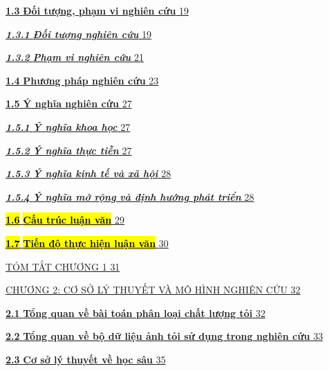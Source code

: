 \documentclass[
]{article}
\begin{document}
\hyperref[_Toc232111984]{\textbf{1.3} \textbf{Đối tượng, phạm vi nghiên
cứu} \hyperref[_Toc232111984]{19}}

\hyperref[_Toc232111985]{\emph{\textbf{1.3.1}} \emph{\textbf{Đối tượng
nghiên cứu}} \hyperref[_Toc232111985]{19}}

\hyperref[_Toc232111986]{\emph{\textbf{1.3.2}} \emph{\textbf{Phạm vi
nghiên cứu}} \hyperref[_Toc232111986]{21}}

\hyperref[_Toc232111987]{\textbf{1.4} \textbf{Phương pháp nghiên cứu}
\hyperref[_Toc232111987]{23}}

\hyperref[_Toc232111988]{\textbf{1.5} \textbf{Ý nghĩa nghiên cứu}
\hyperref[_Toc232111988]{27}}

\hyperref[_Toc232111989]{\emph{\textbf{1.5.1}} \emph{\textbf{Ý nghĩa
khoa học}} \hyperref[_Toc232111989]{27}}

\hyperref[_Toc232111990]{\emph{\textbf{1.5.2}} \emph{\textbf{Ý nghĩa
thực tiễn}} \hyperref[_Toc232111990]{27}}

\hyperref[_Toc232111991]{\emph{\textbf{1.5.3}} \emph{\textbf{Ý nghĩa
kinh tế và xã hội}} \hyperref[_Toc232111991]{28}}

\hyperref[_Toc232111992]{\emph{\textbf{1.5.4}} \emph{\textbf{Ý nghĩa mở
rộng và định hướng phát triển}} \hyperref[_Toc232111992]{28}}

\hyperref[_Toc232111993]{\textbf{\hl{1.6}} \textbf{\hl{Cấu trúc luận
văn}} \hyperref[_Toc232111993]{29}}

\hyperref[_Toc232111994]{\textbf{\hl{1.7}} \textbf{\hl{Tiến độ thực hiện
luận văn}} \hyperref[_Toc232111994]{30}}

\hyperref[tuxf3m-tux1eaft-chux1b0ux1a1ng-1]{TÓM TẮT CHƯƠNG 1
\hyperref[tuxf3m-tux1eaft-chux1b0ux1a1ng-1]{31}}

\hyperref[chux1b0ux1a1ng-2-cux1a1-sux1edf-luxfd-thuyux1ebft-vuxe0-muxf4-huxecnh-nghiuxean-cux1ee9u]{CHƯƠNG
2: CƠ SỞ LÝ THUYẾT VÀ MÔ HÌNH NGHIÊN CỨU
\hyperref[chux1b0ux1a1ng-2-cux1a1-sux1edf-luxfd-thuyux1ebft-vuxe0-muxf4-huxecnh-nghiuxean-cux1ee9u]{32}}

\hyperref[_Toc232111997]{\textbf{2.1} \textbf{Tổng quan về bài toán phân
loại chất lượng tỏi} \hyperref[_Toc232111997]{32}}

\hyperref[_Toc232111998]{\textbf{2.2} \textbf{Tổng quan về bộ dữ liệu
ảnh tỏi sử dụng trong nghiên cứu} \hyperref[_Toc232111998]{33}}

\hyperref[_Toc232111999]{\textbf{2.3} \textbf{Cơ sở lý thuyết về học
sâu} \hyperref[_Toc232111999]{35}}
\end{document}
